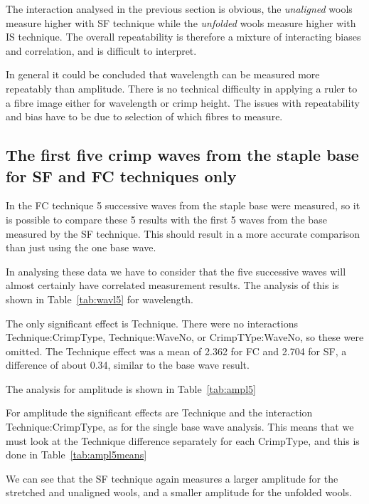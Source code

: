 \documentclass[titlepage,10pt]{article}  %
\begin{document}


The interaction analysed in the previous section is obvious, the {\em unaligned} wools measure higher with SF technique while the {\em unfolded} wools measure higher with IS technique. The overall repeatability is therefore a mixture of interacting biases and correlation, and is difficult to interpret.

In general it could be concluded that wavelength can be measured more repeatably than amplitude.  There is no technical difficulty in applying a ruler to a fibre image either for wavelength or crimp height. The issues with repeatability and bias have to be due to selection of which fibres to measure.

\subsection{The first five crimp waves from the staple base for SF and FC techniques only}
In the FC technique 5 successive waves from the staple base were measured, so it is possible to compare these 5 results with the first 5 waves from the base measured by the SF technique. This should result in a more accurate comparison than just using the one base wave. 

In analysing these data we have to consider  that the five successive waves will almost certainly have correlated measurement results.  The analysis of this is shown in Table~\ref{tab:wavl5} for wavelength.

The only significant effect is Technique. There were no interactions Technique:CrimpType, Technique:WaveNo, or CrimpTYpe:WaveNo, so these were omitted. The Technique effect was a mean of 2.362 for FC and 2.704 for SF, a difference of about 0.34, similar to the base wave result.

The analysis for amplitude is shown in Table~\ref{tab:ampl5}

For amplitude the significant effects are Technique and the interaction Technique:CrimpType,  as for the single base wave analysis. This means that we must look at the Technique difference separately for each CrimpType, and this is done in Table~\ref{tab:ampl5means}

We can see that the SF technique again measures a larger amplitude for the stretched and unaligned wools, and a smaller amplitude for the unfolded wools.
\end{document}
